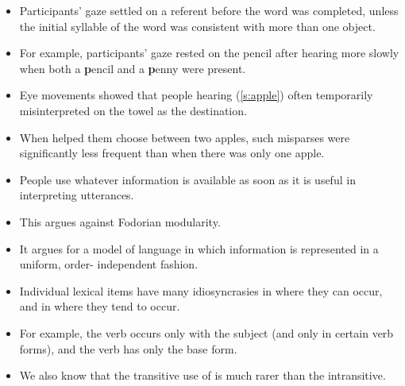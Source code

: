 \documentclass[a4paper,landscape,headrule,footrule,dvips]{foils}
\begin{document}


\begin{itemize}
\item Participants’ gaze settled on a referent before the 
word was completed, unless the initial syllable of the 
word was consistent with more than one object.  
\item For example, participants’ gaze rested on the pencil 
after hearing 
more slowly when both a \textbf{p}encil and a \textbf{p}enny were 
present.
\end{itemize}



\begin{itemize}
\item Eye movements showed that people hearing (\ref{s:apple}) often 
temporarily misinterpreted on the towel as the 
destination.
\begin{exe}
  \ex \label{s:apple} 
\end{exe}
\item When  helped them choose between two 
apples, such misparses were significantly less 
frequent than when there was only one apple.
\end{itemize}



\begin{itemize}
\item People use whatever information is available as 
soon as it is useful in interpreting utterances.
\item This argues against Fodorian modularity.
\item It argues for a model of language in which 
information is represented in a uniform, order-
independent fashion.
\end{itemize}


\begin{itemize}
\item Individual lexical items have many idiosyncrasies in 
where they can occur, and in where they tend to 
occur.  
\item For example, the verb  occurs only with the 
subject  (and only in certain verb forms), and the 
verb  has only the base form.
\item We also know that the transitive use of  is much 
rarer than the intransitive. 
\end{itemize}
\end{document}
